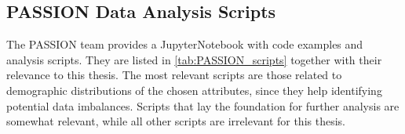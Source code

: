 \documentclass[12pt, a4paper, oneside]{book}   	%
\begin{document}
		\begin{appendices}
		
	
			\chapter{PASSION Data Analysis Scripts}\label{app:PASSIONdataAnalysisScripts}
			The PASSION team provides a \gls{JupyterNotebook} with code examples and analysis scripts. They are listed in \autoref{tab:PASSION_scripts} together with their relevance to this thesis. The most relevant scripts are those related to demographic distributions of the chosen attributes, since they help identifying potential data imbalances. Scripts that lay the foundation for further analysis are somewhat relevant, while all other scripts are irrelevant for this thesis.
			

\end{appendices}
\end{document}
